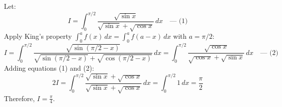 \begin{solutionbox}
Let:
\begin{equation}
I = \int_0^{\pi/2} \frac{\sqrt{\sin x}}{\sqrt{\sin x} + \sqrt{\cos x}}\,dx \quad \text{--- (1)}
\end{equation}
Apply King's property $\int_0^a f(x)\,dx = \int_0^a f(a - x)\,dx$ with $a = \pi/2$:
\begin{equation}
I = \int_0^{\pi/2} \frac{\sqrt{\sin(\pi/2 - x)}}{\sqrt{\sin(\pi/2 - x)} + \sqrt{\cos(\pi/2 - x)}}\,dx = \int_0^{\pi/2} \frac{\sqrt{\cos x}}{\sqrt{\cos x} + \sqrt{\sin x}}\,dx \quad \text{--- (2)}
\end{equation}
Adding equations (1) and (2):
\begin{equation}
2I = \int_0^{\pi/2} \frac{\sqrt{\sin x} + \sqrt{\cos x}}{\sqrt{\sin x} + \sqrt{\cos x}}\,dx = \int_0^{\pi/2} 1\,dx = \frac{\pi}{2}
\end{equation}
Therefore, $I = \frac{\pi}{4}$.
\end{solutionbox}

